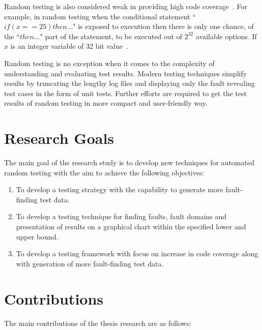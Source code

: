 Random testing is also considered weak in providing high code coverage~\cite{cohen1997aetg, offutt1996semantic}. For example, in random testing when the conditional statement  ``$if (x == 25) then ... $"  is exposed to execution then there is only one chance, of the ``$then...$" part of the statement, to be executed out of $2^\text{32}$ available options. If $x$ is an integer variable of 32 bit value~\cite{godefroid2005dart}. 

Random testing is no exception when it comes to the complexity of understanding and evaluating test results. Modern testing techniques simplify results by truncating the lengthy log files and displaying only the fault revealing test cases in the form of unit tests. Further efforts are required to get the test results of random testing in more compact and user-friendly way. 


\section{Research Goals} \label{ResearchGoals}
The main goal of the research study is to develop new techniques for automated random testing with the aim to achieve the following objectives:

\begin{enumerate}
\item To develop a testing strategy with the capability to generate more fault-finding test data.

\item To develop a testing technique for finding faults, fault domains and presentation of results on a graphical chart within the specified lower and upper bound. 

\item To develop a testing framework with focus on increase in code coverage along with generation of more fault-finding test data. 

\end{enumerate}

\section{Contributions}
The main contributions of the thesis research are as follows: 

